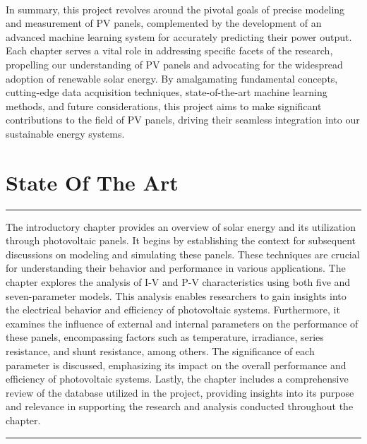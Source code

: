 \documentclass{report}
\begin{document}
\\
In summary, this project revolves around the pivotal goals of precise modeling and measurement of PV panels, complemented by the development of an advanced machine learning system for accurately predicting their power output. Each chapter serves a vital role in addressing specific facets of the research, propelling our understanding of PV panels and advocating for the widespread adoption of renewable solar energy. By amalgamating fundamental concepts, cutting-edge data acquisition techniques, state-of-the-art machine learning methods, and future considerations, this project aims to make significant contributions to the field of PV panels, driving their seamless integration into our sustainable energy systems.
\chapter{State Of The Art}
\noindent\rule{13cm}{1.2pt}\hfill \break
The introductory chapter provides an overview of solar energy and its utilization through photovoltaic panels. It begins by establishing the context for subsequent discussions on modeling and simulating these panels. These techniques are crucial for understanding their behavior and performance in various applications. The chapter explores the analysis of I-V and P-V characteristics using both five and seven-parameter models. This analysis enables researchers to gain insights into the electrical behavior and efficiency of photovoltaic systems. Furthermore, it examines the influence of external and internal parameters on the performance of these panels, encompassing factors such as temperature, irradiance, series resistance, and shunt resistance, among others. The significance of each parameter is discussed, emphasizing its impact on the overall performance and efficiency of photovoltaic systems. Lastly, the chapter includes a comprehensive review of the database utilized in the project, providing insights into its purpose and relevance in supporting the research and analysis conducted throughout the chapter.
\hfill \break
\noindent\rule{13cm}{1.2pt}

\newpage
\hfill \break
\end{document}

